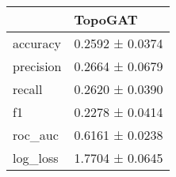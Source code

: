 \begin{tabular}{ll}
\toprule
 & TopoGAT \\
\midrule
accuracy & 0.2592 ± 0.0374 \\
precision & 0.2664 ± 0.0679 \\
recall & 0.2620 ± 0.0390 \\
f1 & 0.2278 ± 0.0414 \\
roc_auc & 0.6161 ± 0.0238 \\
log_loss & 1.7704 ± 0.0645 \\
\bottomrule
\end{tabular}

